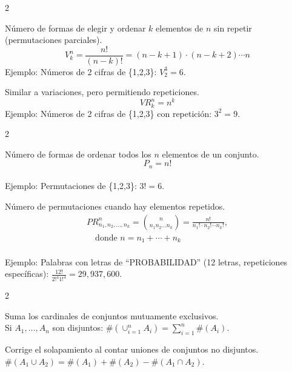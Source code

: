 \documentclass[10pt,a4paper]{article}
\begin{document}
\begin{multicols}{2}
    \begin{tcolorbox}[title=Variaciones sin Repetición, equal height group=COMB2]
        Número de formas de elegir y ordenar \( k \) elementos de \( n \) sin repetir (permutaciones parciales).
        \[
            V_k^n = \frac{n!}{(n-k)!} = (n - k + 1) \cdot (n - k + 2) \cdots n
        \]
        Ejemplo: Números de 2 cifras de \{1,2,3\}: \( V_2^3 = 6 \).
    \end{tcolorbox}
    \begin{tcolorbox}[title=Variaciones con Repetición, equal height group=COMB2]
        Similar a variaciones, pero permitiendo repeticiones.
        \[
            VR_k^n = n^k
        \]
        Ejemplo: Números de 2 cifras de \{1,2,3\} con repetición: \( 3^2 = 9 \).
    \end{tcolorbox}
\end{multicols}

\begin{multicols}{2}
    \begin{tcolorbox}[title=Permutaciones sin Repetición, equal height group=COMB3]
        Número de formas de ordenar todos los \( n \) elementos de un conjunto. 
        \[
            P_n = n!
        \] \\
        Ejemplo: Permutaciones de \{1,2,3\}: \( 3! = 6 \).
    \end{tcolorbox}
    \begin{tcolorbox}[title=Permutaciones con Repetición, equal height group=COMB3]
        Número de permutaciones cuando hay elementos repetidos.
        \begin{align*}
            PR_{n_1, n_2, \dots, n_k}^n = \binom{n}{n_1 n_2 \dots n_k} = \frac{n!}{n_1! \cdot n_2! \cdots n_k!}, \\
            \quad \text{donde } n = n_1 + \cdots + n_k
        \end{align*} \\
        Ejemplo: Palabras con letras de ``PROBABILIDAD'' (12 letras, repeticiones específicas): \( \frac{12!}{{2!}^4 {1!}^4} = 29,937,600 \).
    \end{tcolorbox}
\end{multicols}

\begin{multicols}{2}
    \begin{tcolorbox}[title=Principio de la Suma, equal height group=COMB4]
        Suma los cardinales de conjuntos mutuamente exclusivos. \\
        Si \( A_1, \dots, A_n \) son disjuntos: \( \#(\cup_{i=1}^n A_i) = \sum_{i=1}^n \#(A_i) \).
        
    \end{tcolorbox}
    \begin{tcolorbox}[title=Principio del Producto, equal height group=COMB4]
        Corrige el solapamiento al contar uniones de conjuntos no disjuntos. \\
        \( \#(A_1 \cup A_2) = \#(A_1) + \#(A_2) - \#(A_1 \cap A_2) \).
    \end{tcolorbox}
\end{multicols}
\end{document}
